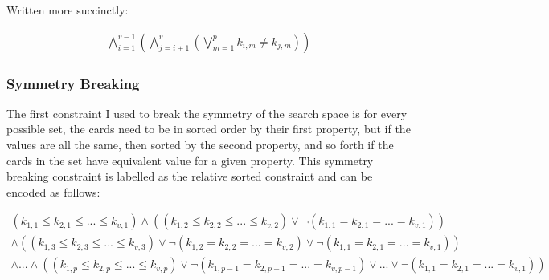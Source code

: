 \documentclass[pageno]{jpaper}
\begin{document}
Written more succinctly:





\begin{align}
	\bigwedge \limits_{i=1}^{v-1}   \left( \bigwedge \limits_{j=i+1}^{v}   \left( \bigvee \limits_{m = 1}^{p} k_{i,m} \neq k_{j,m} \right)  \right)
\end{align}

\subsubsection {Symmetry Breaking}

The first constraint I used to break the symmetry of the search space is for every possible set, the cards need to be in sorted order by their first property, but if the values are all the same, then sorted by the second property, and so forth if the cards in the set have equivalent value for a given property. This symmetry breaking constraint is labelled as the relative sorted constraint and can be encoded as follows: 

\begin{multline}
	(k_{1,1} \leq k_{2,1} \leq ... \leq k_{v,1}) \wedge (   (k_{1,2} \leq k_{2,2} \leq ... \leq k_{v,2})  \vee \neg (k_{1,1} = k_{2,1} = ... = k_{v,1})) \\
	\wedge (   (k_{1,3} \leq k_{2,3} \leq ... \leq k_{v,3})  \vee \neg (k_{1,2} = k_{2,2} = ... = k_{v,2}) \vee \neg (k_{1,1} = k_{2,1} = ... = k_{v,1})) \\
	\wedge ... \wedge (   (k_{1,p} \leq k_{2,p} \leq ... \leq k_{v,p})  \vee \neg (k_{1,p-1} = k_{2,p-1} = ... = k_{v,p-1}) \vee ... \vee \neg (k_{1,1} = k_{2,1} = ... = k_{v,1}))
\end{multline}
\end{document}
